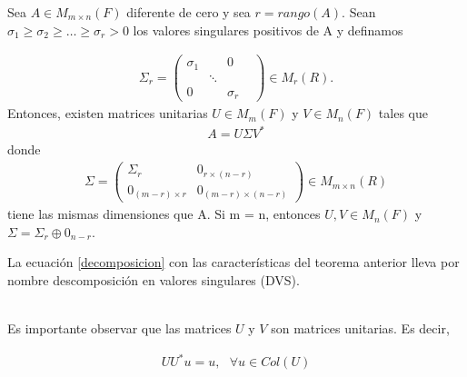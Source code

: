 \begin{theorem}
Sea $A \in M_{m \times n} (F)$ diferente de cero y sea $r =   rango(A)$. Sean $\sigma_1 \geq \sigma_2 \geq \dots \geq \sigma_r > 0$ los valores singulares positivos de A y definamos

\begin{equation*}
    \begin{aligned}
    \Sigma_r = 
    \begin{pmatrix}
    \sigma_1 & & 0 \\
     & \ddots & & \\
     0 & & \sigma_r
    \end{pmatrix}
    \in M_{r}(R).
    \end{aligned}
\end{equation*}
Entonces, existen matrices unitarias $U \in M_{m}(F)$ y $V \in M_{n}(F)$ tales que 
\begin{equation} \label{decomposicion}
    \begin{aligned}
    A = U \Sigma V^{*}
    \end{aligned}
\end{equation}
donde
\begin{equation*}
    \begin{aligned}
    \Sigma = 
    \begin{pmatrix}
    \Sigma_r & 0_{r \times (n-r)} \\
    0_{(m-r) \times r} & 0_{(m-r) \times (n-r)}
    \end{pmatrix}
    \in M_{m \times n}(R)
    \end{aligned}
\end{equation*}
 tiene las mismas dimensiones que A. Si m = n, entonces $U, V \in M_{n}(F)$ y $\Sigma = \Sigma_r \oplus 0_{n-r}$.
 \cite{garcia2017second}
\end{theorem}

La ecuación \ref{decomposicion} con las características del teorema anterior lleva por nombre descomposición en valores singulares (DVS). 

\\

Es importante observar que las matrices $U$ y $V$ son matrices unitarias. Es decir, 

\begin{equation*}
    \begin{aligned}
    U U^{*} u = u, \text{ } \forall u \in Col (U)
    \end{aligned}
\end{equation*}

